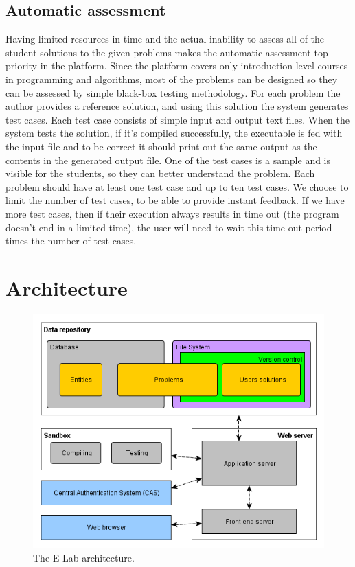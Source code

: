 \documentclass{article}
\begin{document}
\subsection{Automatic assessment}
Having limited resources in time and the actual inability to assess all of the
student solutions to the given problems makes the automatic assessment
top priority in the platform. Since the platform covers only introduction level
courses in programming and algorithms, most of the problems can be designed so
they can be assessed by simple black-box testing methodology. For each problem
the author provides a reference solution, and using this solution the system
generates test cases. Each test case consists of simple input and output text
files. When the system tests the solution, if it's compiled successfully, the
executable is fed with the input file and to be correct it should print out
the same output as the contents in the generated output file. One of the test
cases is a sample and is visible for the students, so they can better understand
the problem. Each problem should have at least one test case and up to ten test
cases. We choose to limit the number of test cases, to be able to provide
instant feedback. If we have more test cases, then if their execution always
results in time out (the program doesn't end in a limited time), the user will
need to wait this time out period times the number of test cases.

\section{Architecture}

\begin{figure}
\centering
\includegraphics[width=.99\textwidth]{e-lab/architecture}
\caption{The E-Lab architecture.}
\label{fig:architecture}
\end{figure}
\end{document}
